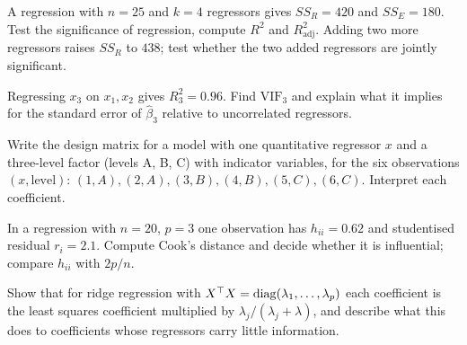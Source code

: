 \begin{exercise}
A regression with $n=25$ and $k=4$ regressors gives $SS_R=420$ and $SS_E=180$. Test the significance of regression, compute $R^2$ and $R^2_{\mathrm{adj}}$. Adding two more regressors raises $SS_R$ to $438$; test whether the two added regressors are jointly significant.
\end{exercise}

\begin{exercise}
Regressing $x_3$ on $x_1,x_2$ gives $R_3^2=0.96$. Find $\mathrm{VIF}_3$ and explain what it implies for the standard error of $\hat\beta_3$ relative to uncorrelated regressors.
\end{exercise}

\begin{exercise}
Write the design matrix for a model with one quantitative regressor $x$ and a three-level factor (levels A, B, C) with indicator variables, for the six observations $(x,\text{level})$: $(1,A),(2,A),(3,B),(4,B),(5,C),(6,C)$. Interpret each coefficient.
\end{exercise}

\begin{exercise}
In a regression with $n=20$, $p=3$ one observation has $h_{ii}=0.62$ and studentised residual $r_i=2.1$. Compute Cook's distance and decide whether it is influential; compare $h_{ii}$ with $2p/n$.
\end{exercise}

\begin{exercise}
Show that for ridge regression with $X^{\top} X=\operatorname{diag}(\lambda_1,\dots,\lambda_p)$ each coefficient is the least squares coefficient multiplied by $\lambda_j/(\lambda_j+\lambda)$, and describe what this does to coefficients whose regressors carry little information.
\end{exercise}
